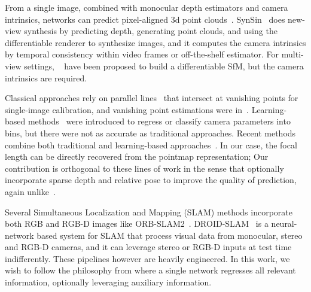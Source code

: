 From a single image, combined with monocular depth estimators and camera intrinsics, networks can predict pixel-aligned 3d point clouds~\cite{bian2022auto, szymanowicz2024flash3d, yin2022towards, yin2021learning}.
SynSin~\cite{wiles2020synsin} does new-view synthesis by predicting depth, generating point clouds, and using the differentiable renderer to synthesize images, and it computes the camera intrinsics by temporal consistency within video frames or off-the-shelf estimator.
For multi-view settings, ~\cite{teed2020deepv2d, ummenhofer2017demon, zhou2018deeptam} have been proposed to build a differentiable SfM, but the camera intrinsics are required.


Classical approaches rely on parallel lines~\cite{grompone2010lsd} that intersect at vanishing points for single-image calibration, and vanishing point estimations were in~\cite{bernard1983interpreting, kluger2020consac, zhai2016detecting, tong2022transformer}.
Learning-based methods~\cite{lopez2019deep, hold-geoffroy2022deep,zhai2016detecting} were introduced to regress or classify camera parameters into bins, but there were not as accurate as traditional approaches.
Recent methods combine both traditional and learning-based approaches~\cite{zhu2023tame, veicht2024geocalib}. In our case, the focal length can be directly recovered from the pointmap representation; Our contribution is orthogonal to these lines of work in the sense that \ours{} optionally incorporate sparse depth and relative pose to improve the quality of prediction, again unlike~\duster{}.



Several Simultaneous Localization and Mapping (SLAM) methods incorporate both RGB and RGB-D images like ORB-SLAM2~\cite{mur2017orb}.
DROID-SLAM~\cite{teed2021droid} is a neural-network based system for SLAM that process visual data from monocular, stereo and RGB-D cameras, and it can leverage stereo or RGB-D inputs at test time indifferently. These pipelines however are heavily engineered. In this work, we wish to follow the philosophy from \duster{} where a single network regresses all relevant information, optionally leveraging auxiliary information. %



















